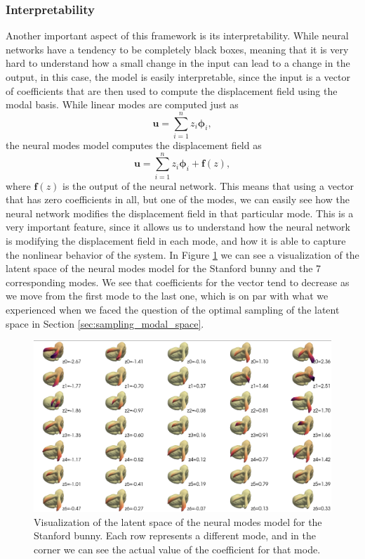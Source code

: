 \subsubsection{Interpretability}
Another important aspect of this framework is its interpretability. While neural networks have a tendency to be completely black boxes, meaning that it is very hard to understand how a small change in the input can lead to a change in the output, in this case, the model is easily interpretable, since the input is a vector of coefficients that are then used to compute the displacement field using the modal basis. While linear modes are computed just as 
\begin{equation*}
    \bm{u} = \sum_{i=1}^n z_i \bm{\phi}_i,
    \end{equation*}
    the neural modes model computes the displacement field as
    \begin{equation*}
    \bm{u} = \sum_{i=1}^n z_i \bm{\phi}_i + \bm{f}(z),
    \end{equation*}
    where $\bm{f}(z)$ is the output of the neural network. This means that using a vector that has zero coefficients in all, but one of the modes, we can easily see how the neural network modifies the displacement field in that particular mode. This is a very important feature, since it allows us to understand how the neural network is modifying the displacement field in each mode, and how it is able to capture the nonlinear behavior of the system. 
    In Figure \ref{fig:latent_space_viz} we can see a visualization of the latent space of the neural modes model for the Stanford bunny and the 7 corresponding modes. We see that coefficients for the vector tend to decrease as we move from the first mode to the last one, which is on par with what we experienced when we faced the question of the optimal sampling of the latent space in Section \ref{sec:sampling_modal_space}.

\begin{figure}[H]
    \centering
    \includegraphics[width=\textwidth]{Images/latent_space_viz.png}
    \caption{Visualization of the latent space of the neural modes model for the Stanford bunny. Each row represents a different mode, and in the corner we can see the actual value of the coefficient for that mode.}
    \label{fig:latent_space_viz}
    \end{figure}
    

